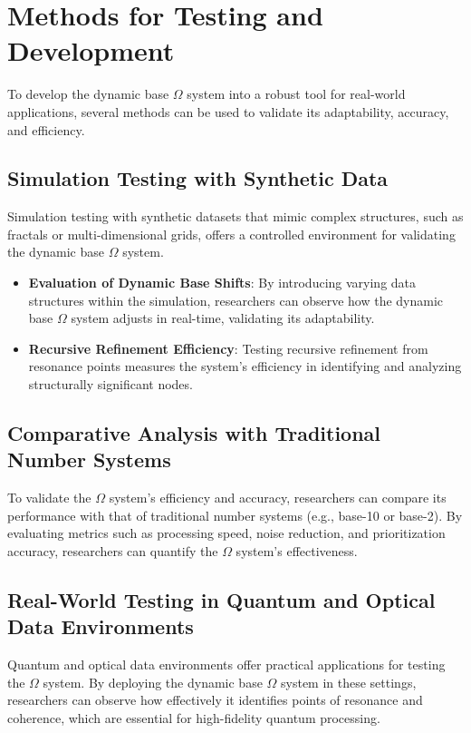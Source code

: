 \documentclass{article}
\begin{document}
\section{Methods for Testing and Development}

To develop the dynamic base $\Omega$ system into a robust tool for real-world applications, several methods can be used to validate its adaptability, accuracy, and efficiency.

\subsection{Simulation Testing with Synthetic Data}

Simulation testing with synthetic datasets that mimic complex structures, such as fractals or multi-dimensional grids, offers a controlled environment for validating the dynamic base $\Omega$ system.

\begin{itemize}
    \item \textbf{Evaluation of Dynamic Base Shifts}: By introducing varying data structures within the simulation, researchers can observe how the dynamic base $\Omega$ system adjusts in real-time, validating its adaptability.
    \item \textbf{Recursive Refinement Efficiency}: Testing recursive refinement from resonance points measures the system’s efficiency in identifying and analyzing structurally significant nodes.
\end{itemize}

\subsection{Comparative Analysis with Traditional Number Systems}

To validate the $\Omega$ system’s efficiency and accuracy, researchers can compare its performance with that of traditional number systems (e.g., base-10 or base-2). By evaluating metrics such as processing speed, noise reduction, and prioritization accuracy, researchers can quantify the $\Omega$ system’s effectiveness.

\subsection{Real-World Testing in Quantum and Optical Data Environments}

Quantum and optical data environments offer practical applications for testing the $\Omega$ system. By deploying the dynamic base $\Omega$ system in these settings, researchers can observe how effectively it identifies points of resonance and coherence, which are essential for high-fidelity quantum processing.
\end{document}
